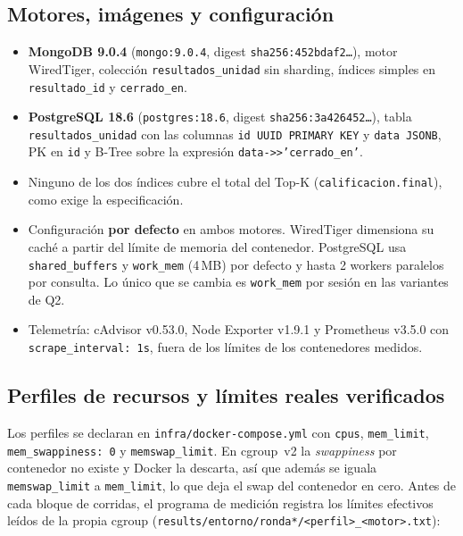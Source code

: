 \documentclass[11pt,letterpaper]{article}
\begin{document}
\subsection{Motores, imágenes y configuración}
\begin{itemize}
  \item \textbf{MongoDB 9.0.4} (\texttt{mongo:9.0.4}, digest \texttt{sha256:452bdaf2\ldots}),
        motor WiredTiger, colección \texttt{resultados\_unidad} sin sharding, índices simples en
        \texttt{resultado\_id} y \texttt{cerrado\_en}.
  \item \textbf{PostgreSQL 18.6} (\texttt{postgres:18.6}, digest \texttt{sha256:3a426452\ldots}),
        tabla \texttt{resultados\_unidad} con las columnas \texttt{id UUID PRIMARY KEY} y
        \texttt{data JSONB}, PK en \texttt{id} y
        B-Tree sobre la expresión \texttt{data->>'cerrado\_en'}.
  \item Ninguno de los dos índices cubre el total del Top-K (\texttt{calificacion.final}), como
        exige la especificación.
  \item Configuración \textbf{por defecto} en ambos motores. WiredTiger dimensiona su caché
        a partir del límite de memoria del contenedor. PostgreSQL usa \texttt{shared\_buffers} y
        \texttt{work\_mem} (4\,MB) por defecto y hasta 2 workers paralelos por consulta. Lo único
        que se cambia es \texttt{work\_mem} por sesión en las variantes de Q2.
  \item Telemetría: cAdvisor v0.53.0, Node Exporter v1.9.1 y Prometheus v3.5.0 con
        \texttt{scrape\_interval: 1s}, fuera de los límites de los contenedores medidos.
\end{itemize}

\subsection{Perfiles de recursos y límites reales verificados}
Los perfiles se declaran en \texttt{infra/docker-compose.yml} con \texttt{cpus},
\texttt{mem\_limit}, \texttt{mem\_swappiness: 0} y \texttt{memswap\_limit}. En cgroup~v2 la
\emph{swappiness} por contenedor no existe y Docker la descarta, así que además se iguala
\texttt{memswap\_limit} a \texttt{mem\_limit}, lo que deja el swap del contenedor en cero.
Antes de cada bloque de corridas, el programa de medición registra los límites efectivos
leídos de la propia cgroup (\texttt{results/entorno/ronda*/<perfil>\_<motor>.txt}):
\end{document}
